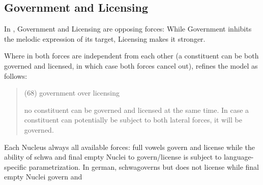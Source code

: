\subsection{Government and Licensing}

In \CVCV, Government and Licensing are opposing forces:
While Government inhibits the melodic expression of
its target, Licensing makes it stronger.

Where in \cite{scheer2004} both forces are independent
from each other (a constituent can be both governed
and licensed, in which case both forces cancel out),
\cite{scheer2012} refines the model as follows:
\blockquote[\cite{scheer2012}]{
  (68) government over licensing
  
  no constituent can be governed and licensed at the
  same time. In case a constituent can potentially be
  subject to both lateral forces, it will be governed.
}

Each Nucleus always 
all available forces: full vowels govern and license
while the ability of schwa and final empty Nuclei to
govern/license is subject to language-specific
parametrization.
In german, schwa\co governs but does not license while
final empty Nuclei govern and \TODO{}